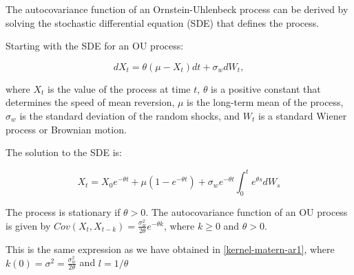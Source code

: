 The autocovariance function of an Ornstein-Uhlenbeck process can be derived by solving the stochastic differential equation (SDE) that defines the process.

Starting with the SDE for an OU process:

$$dX_t = \theta (\mu - X_t)dt + \sigma_w dW_t,$$

where $X_t$ is the value of the process at time $t$, $\theta$ is a positive constant that determines the speed of mean reversion,
$\mu$ is the long-term mean of the process, $\sigma_w$ is the standard deviation of the random shocks, and $W_t$ is a standard Wiener process or Brownian motion.

The solution to the SDE is:

$$ X_t = X_0 e^{-\theta t} + \mu (1-e^{-\theta t}) +
\sigma_w e^{-\theta t} \int_{0}^{t} e^{\theta s} dW_s$$

%
%
%
%
%
%
%
%
%
%
%
%
%
%
The process is stationary if $\theta > 0$.
The autocovariance function of an OU process is given by
$Cov(X_t, X_{t-k}) = \frac{\sigma_w^2}{2\theta} e^{-\theta k}$,
where $k\geq 0$ and $\theta > 0$.

This is the same expression as we have obtained in \ref{kernel-matern-ar1}, where
$k(0) = \sigma^2 = \frac{\sigma_w^2}{2\theta}$ and $l=1/\theta$

